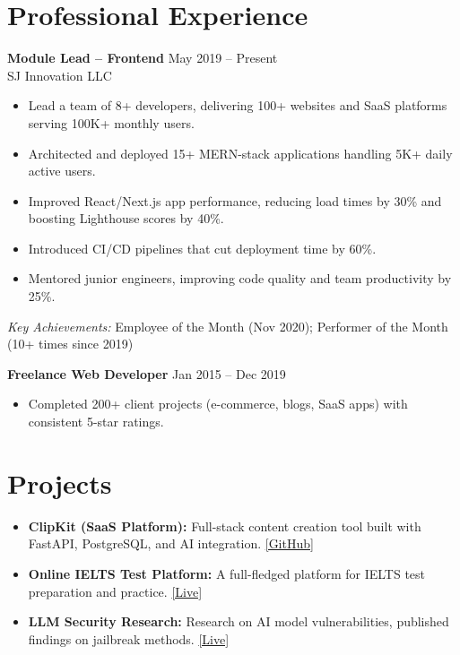 \documentclass[a4paper,10pt]{article}
\begin{document}
\section*{Professional Experience}

\textbf{Module Lead – Frontend} \hfill May 2019 – Present \\
SJ Innovation LLC
\begin{itemize}[leftmargin=*,itemsep=0.5pt]
    \item Lead a team of 8+ developers, delivering 100+ websites and SaaS platforms serving 100K+ monthly users.
    \item Architected and deployed 15+ MERN-stack applications handling 5K+ daily active users.
    \item Improved React/Next.js app performance, reducing load times by 30\% and boosting Lighthouse scores by 40\%.
    \item Introduced CI/CD pipelines that cut deployment time by 60\%.
    \item Mentored junior engineers, improving code quality and team productivity by 25\%.
\end{itemize}
\textit{Key Achievements:} Employee of the Month (Nov 2020); Performer of the Month (10+ times since 2019)

\textbf{Freelance Web Developer} \hfill Jan 2015 – Dec 2019
\begin{itemize}[leftmargin=*,itemsep=0.5pt]
    \item Completed 200+ client projects (e-commerce, blogs, SaaS apps) with consistent 5-star ratings.
\end{itemize}

\section*{Projects}
\begin{itemize}[leftmargin=*,itemsep=0.5pt]
    \item \textbf{ClipKit (SaaS Platform):} Full-stack content creation tool built with FastAPI, PostgreSQL, and AI integration. \href{https://github.com/RajonDey/clipkit-app}{[GitHub]}
    \item \textbf{Online IELTS Test Platform:} A full-fledged platform for IELTS test preparation and practice. \href{https://ielts-test-platform-0-01.vercel.app/}{[Live]}
    \item \textbf{LLM Security Research:} Research on AI model vulnerabilities, published findings on jailbreak methods. \href{https://llm-vulnerability-site.vercel.app/}{[Live]}
\end{itemize}
\end{document}
